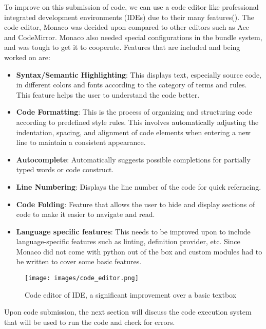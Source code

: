 To improve on this submission of code, we can use a code editor like professional integrated development environments (IDEs) due to their many features(\cite{kapoor2024analysis}). The code editor, Monaco was decided upon compared to other editors such as Ace and CodeMirror. Monaco also needed special configurations in the bundle system, and was tough to get it to cooperate. Features that are included and being worked on are:
\begin{itemize}
    \item \textbf{Syntax/Semantic Highlighting}: This displays text, especially source code, in different colors and fonts according to the category of terms and rules. This feature helps the user to understand the code better.
    \item \textbf{Code Formatting}: This is the process of organizing and structuring code according to predefined style rules. This involves automatically adjusting the indentation, spacing, and alignment of code elements when entering a new line to maintain a consistent appearance.
    \item \textbf{Autocomplete}: Automatically suggests possible completions for partially typed words or code construct.
    \item \textbf{Line Numbering}: Displays the line number of the code for quick referncing.
    \item \textbf{Code Folding}: Feature that allows the user to hide and display sections of code to make it easier to navigate and read.
    \item \textbf{Language specific features}: This needs to be improved upon to include language-specific features such as linting, definition provider, etc. Since Monaco did not come with python out of the box and custom modules had to be written to cover some basic features.
\end{itemize}
\begin{figure}[H]
    \centering
    \texttt{[image: images/code\_editor.png]}
    \caption{Code editor of IDE, a significant improvement over a basic textbox}
\end{figure}
Upon code submission, the next section will discuss the code execution system that will be used to run the code and check for errors.

